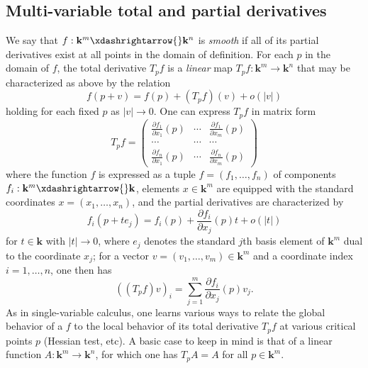 \documentclass[reqno]{amsart} 
\begin{document}
\subsection{Multi-variable total and partial derivatives\label{sec:calc-multi}}
\label{sec:org2290879}
We say that $f : \mathbf{k}^m \xdashrightarrow{} \mathbf{k}^n$ is \emph{smooth}
if all of its partial derivatives exist at all points in the domain of definition.
For each $p$ in the domain of $f$, the total derivative
$T_p f$ is a \emph{linear} map $T_p f : \mathbf{k}^m
\rightarrow \mathbf{k}^n$
that may be characterized as above by the relation
\begin{equation*}
  f(p+v) = f(p) + (T_p f)(v) + o(|v|)
\end{equation*}
holding for each fixed $p$ as $|v| \rightarrow 0$.
One can express $T_p f$ in matrix form
\begin{equation*}
  T_p f
  = 
\begin{pmatrix}
    \frac{\partial f_1}{\partial x_1}(p) & \dotsb  & \frac{\partial f_1}{\partial x_m}(p) \\
    \dotsb  & \dotsb  & \dotsb  \\
    \frac{\partial f_n}{\partial x_1}(p) & \dotsb  & \frac{\partial f_n}{\partial x_m}(p)
  \end{pmatrix}
\end{equation*}
where the function $f$ is expressed
as a tuple $f =  (f_1,\dotsc,f_n)$ of components $f_i : \mathbf{k}^m \xdashrightarrow{}
\mathbf{k}$,
elements $x \in \mathbf{k}^m$ are equipped with the standard coordinates $x =
(x_1,\dotsc,x_n)$,
and the partial derivatives are characterized by
\begin{equation*}
  f_i(p + t e_j)
  =
  f_i(p)
  +
  \frac{\partial f_i}{\partial x_j}(p)
  t +
  o(|t|)
\end{equation*}
for $t \in \mathbf{k}$ with $|t| \rightarrow 0$, where $e_j$
denotes the standard $j$th basis element of $\mathbf{k}^m$ dual
to the coordinate $x_j$;
for a vector $v = (v_1,\dotsc,v_m) \in \mathbf{k}^m$
and a coordinate index $i = 1,\dotsc,n$,
one then has
\begin{equation*}
((T_p f) v)_i
=
\sum_{j=1}^m
\frac{\partial f_i}{\partial x_j}(p)
v_j.
\end{equation*}
As in single-variable calculus, one learns various ways to
relate the global behavior of
a $f$
to the local behavior of its
total derivative $T_p f$ at various critical points $p$ (Hessian test, etc).
A basic case to keep in mind is that of a linear
function $A : \mathbf{k}^m \rightarrow \mathbf{k}^n$,
for which one has $T_p A = A$ for all $p \in \mathbf{k}^m$.
\end{document}
